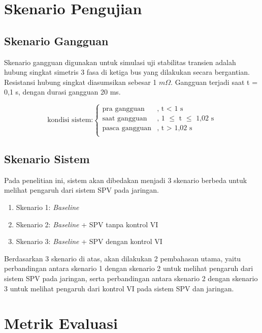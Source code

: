 \section{Skenario Pengujian}



\subsection{Skenario Gangguan}

Skenario gangguan digunakan untuk simulasi uji stabilitas transien adalah hubung singkat simetris 3 fasa di ketiga bus yang dilakukan secara bergantian. Resistansi hubung singkat diasumsikan sebesar 1 $\mathit{m\Omega}$. Gangguan terjadi saat t = 0,1 s, dengan durasi gangguan 20 ms.

\[
\text{kondisi sistem:}
\begin{cases}
      \text{pra gangguan} & \text{, t $<$ 1 s} \\
      \text{saat gangguan} & \text{, 1 $\leq$ t $\leq$ 1,02 s} \\
	  \text{pasca gangguan} & \text{, t $>$ 1,02 s} \\
\end{cases}
\]



\subsection{Skenario Sistem}

Pada penelitian ini, sistem akan dibedakan menjadi 3 skenario berbeda untuk melihat pengaruh dari sistem SPV pada jaringan.

\begin{enumerate}
	\item Skenario 1: \textit{Baseline}
	\item Skenario 2: \textit{Baseline} + SPV tanpa kontrol VI
	\item Skenario 3: \textit{Baseline} + SPV dengan kontrol VI
\end{enumerate}

Berdasarkan 3 skenario di atas, akan dilakukan 2 pembahasan utama, yaitu perbandingan antara skenario 1 dengan skenario 2 untuk melihat pengaruh dari sistem SPV pada jaringan, serta perbandingan antara skenario 2 dengan skenario 3 untuk melihat pengaruh dari kontrol VI pada sistem SPV dan jaringan.




\section{Metrik Evaluasi}

